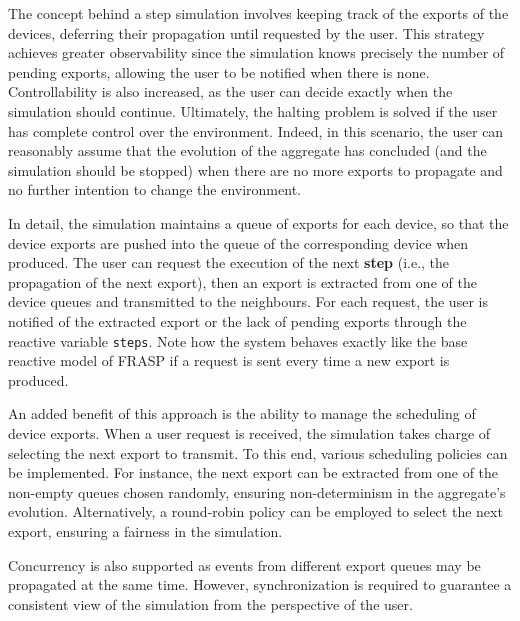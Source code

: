 The concept behind a step simulation involves keeping track of the exports of
the devices, deferring their propagation until requested by the user. This
strategy achieves greater observability since the simulation knows precisely
the number of pending exports, allowing the user to be notified when there is
none. Controllability is also increased, as the user can decide exactly when
the simulation should continue. Ultimately, the halting problem is solved if
the user has complete control over the environment. Indeed, in this scenario,
the user can reasonably assume that the evolution of the aggregate has
concluded (and the simulation should be stopped) when there are no more exports
to propagate and no further intention to change the environment.

In detail, the simulation maintains a queue of exports for each device, so that
the device exports are pushed into the queue of the corresponding device when
produced. The user can request the execution of the next \textbf{step} (i.e.,
the propagation of the next export), then an export is extracted from one of
the device queues and transmitted to the neighbours. For each request, the user
is notified of the extracted export or the lack of pending exports through the
reactive variable \texttt{steps}. Note how the system behaves exactly like the
base reactive model of FRASP if a request is sent every time a new export is
produced.

An added benefit of this approach is the ability to manage the scheduling of
device exports. When a user request is received, the simulation takes charge of
selecting the next export to transmit. To this end, various scheduling policies
can be implemented. For instance, the next export can be extracted from one of
the non-empty queues chosen randomly, ensuring non-determinism in the
aggregate's evolution. Alternatively, a round-robin policy can be employed to
select the next export, ensuring a fairness in the simulation.

Concurrency is also supported as events from different export queues may be
propagated at the same time. However, synchronization is required to guarantee
a consistent view of the simulation from the perspective of the user.

